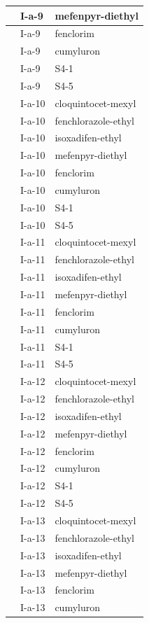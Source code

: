 \documentclass[11pt,a4paper]{article}
\begin{document}
\begin{table}[h]
\begin{tabular}{|l|l|l|}
 & I-a-9 & mefenpyr-diethyl \\ \hline
 & I-a-9 & fenclorim \\ \hline
 & I-a-9 & cumyluron \\ \hline
 & I-a-9 & S4-1 \\ \hline
 & I-a-9 & S4-5 \\ \hline
 & I-a-10 & cloquintocet-mexyl \\ \hline
 & I-a-10 & fenchlorazole-ethyl \\ \hline
 & I-a-10 & isoxadifen-ethyl \\ \hline
 & I-a-10 & mefenpyr-diethyl \\ \hline
 & I-a-10 & fenclorim \\ \hline
 & I-a-10 & cumyluron \\ \hline
 & I-a-10 & S4-1 \\ \hline
 & I-a-10 & S4-5 \\ \hline
 & I-a-11 & cloquintocet-mexyl \\ \hline
 & I-a-11 & fenchlorazole-ethyl \\ \hline
 & I-a-11 & isoxadifen-ethyl \\ \hline
 & I-a-11 & mefenpyr-diethyl \\ \hline
 & I-a-11 & fenclorim \\ \hline
 & I-a-11 & cumyluron \\ \hline
 & I-a-11 & S4-1 \\ \hline
 & I-a-11 & S4-5 \\ \hline
 & I-a-12 & cloquintocet-mexyl \\ \hline
 & I-a-12 & fenchlorazole-ethyl \\ \hline
 & I-a-12 & isoxadifen-ethyl \\ \hline
 & I-a-12 & mefenpyr-diethyl \\ \hline
 & I-a-12 & fenclorim \\ \hline
 & I-a-12 & cumyluron \\ \hline
 & I-a-12 & S4-1 \\ \hline
 & I-a-12 & S4-5 \\ \hline
 & I-a-13 & cloquintocet-mexyl \\ \hline
 & I-a-13 & fenchlorazole-ethyl \\ \hline
 & I-a-13 & isoxadifen-ethyl \\ \hline
 & I-a-13 & mefenpyr-diethyl \\ \hline
 & I-a-13 & fenclorim \\ \hline
 & I-a-13 & cumyluron \\ \hline

\end{tabular}
\end{table}
\end{document}
